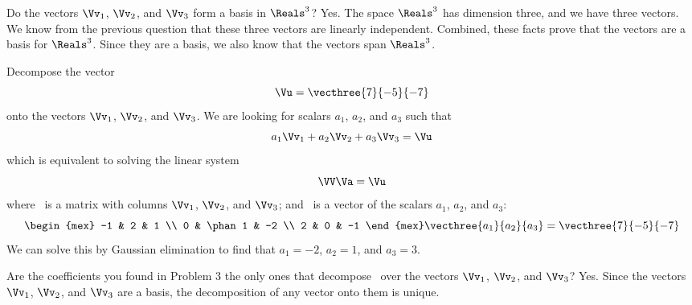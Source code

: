 \documentclass[12pt,ragged]{pajarticle}
\begin{document}
\begin{question}{2}{%
Do the vectors $\Vv_1$, $\Vv_2$, and $\Vv_3$ form a basis in $\Reals^3$?
}{
Yes. The space $\Reals^3$ has dimension three, and we have three vectors. We know from the previous question that these three vectors are linearly independent. Combined, these facts prove that the vectors are a basis for $\Reals^3$. Since they are a basis, we also know that the vectors span $\Reals^3$.
}
\end{question}


\begin{question}{3}{%
Decompose the vector 
\[ \Vu = \vecthree{7}{-5}{-7} \]
onto the vectors $\Vv_1$, $\Vv_2$, and $\Vv_3$.}{
We are looking for scalars $a_1$, $a_2$, and $a_3$ such that
\[ a_1\Vv_1 + a_2\Vv_2 + a_3\Vv_3 = \Vu \]
which is equivalent to solving the linear system
\[ \VV\Va = \Vu \]
where \VV\ is a matrix with columns $\Vv_1$, $\Vv_2$, and $\Vv_3$; and \Va\ is a vector of the scalars $a_1$, $a_2$, and $a_3$:
\[ \begin{mex} -1 & 2 & 1 \\ 0 & \phan1 & -2 \\ 2 & 0 & -1 \end{mex} \vecthree{a_1}{a_2}{a_3} = \vecthree{7}{-5}{-7} \]
We can solve this by Gaussian elimination to find that $a_1=-2$, $a_2=1$, and $a_3=3$.
}	
\end{question}

\begin{question}{4}{%
Are the coefficients you found in Problem 3 the only ones that decompose \Vu\ over the vectors $\Vv_1$, $\Vv_2$, and $\Vv_3$?
}{
Yes. Since the vectors $\Vv_1$, $\Vv_2$, and $\Vv_3$ are a basis, the decomposition of any vector onto them is unique.
}
\end{question}
\end{document}

